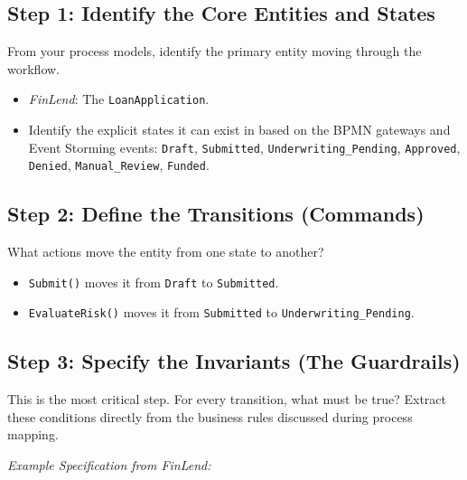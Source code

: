 \subsection{Step 1: Identify the Core Entities and
States}\label{step-1-identify-the-core-entities-and-states}

From your process models, identify the primary entity moving through the
workflow.

\begin{itemize}
\tightlist
\item
  \emph{FinLend}: The \texttt{LoanApplication}.
\item
  Identify the explicit states it can exist in based on the BPMN
  gateways and Event Storming events: \texttt{Draft},
  \texttt{Submitted}, \texttt{Underwriting\_Pending}, \texttt{Approved},
  \texttt{Denied}, \texttt{Manual\_Review}, \texttt{Funded}.
\end{itemize}

\subsection{Step 2: Define the Transitions
(Commands)}\label{step-2-define-the-transitions-commands}

What actions move the entity from one state to another?

\begin{itemize}
\tightlist
\item
  \texttt{Submit()} moves it from \texttt{Draft} to \texttt{Submitted}.
\item
  \texttt{EvaluateRisk()} moves it from \texttt{Submitted} to
  \texttt{Underwriting\_Pending}.
\end{itemize}

\subsection{Step 3: Specify the Invariants (The
Guardrails)}\label{step-3-specify-the-invariants-the-guardrails}

This is the most critical step. For every transition, what must be true?
Extract these conditions directly from the business rules discussed
during process mapping.

\emph{Example Specification from FinLend:}

